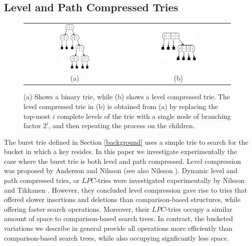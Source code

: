 \documentclass[]{acmtrans2m}
\begin{document}
\subsection{Level and Path Compressed Tries}
\label{level_path_comp}

\begin{figure}%
\center
\begin{tabular}{cc}
\includegraphics[width=0.3\textwidth]{figs/binary_trie.eps} & \includegraphics[width=0.35\textwidth]{figs/lc_trie.eps}\\
(a) & (b)\\
\end{tabular}
\caption{(a) Shows a binary trie, while (b) shows a level compressed trie. The level compressed trie in (b) is obtained
from (a) by replacing the top-most $i$ complete levels of the trie with a single node of branching factor $2^i$, and then
repeating the process on the children.}
\label{lctrie_fig}
\end{figure}

The burst trie defined in Section \ref{background} uses a simple trie to search for
the bucket in which a key resides. In this paper we investigate experimentally the
case where the burst trie is both level and path compressed. Level compression
was proposed by Anderson and Nilsson \citeyear{AnderssonNilsson93} (see also Nilsson \citeyear{Nilsson96}). 
Dynamic level and path compressed tries, or
$LPC$-tries were investigated experimentally by Nilsson and Tikkanen \citeyear{NilssonTikkanen02}. 
However, they concluded level compression gave rise to tries that offered slower insertions
and deletions than comparison-based structures, while offering faster search operations.
Moreover, their $LPC$-tries occupy a similar amount of space to comparison-based search
trees. In contrast, the bucketed variations we describe in general provide all operations
more efficiently than comparison-based search trees, while also occupying signficantly less
space.
\end{document}

